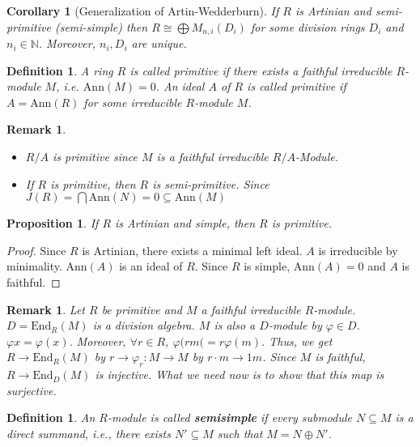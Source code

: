 \documentclass[letterpaper, leqno, 12pt]{article}
\newcommand{\fin}{\qquad \quad \hfill \framebox[1.75mm][l]{\,}}
\newcommand{\bN}{\mathbb{N}}
\newcommand{\Ann}{\mbox{Ann}}
\theoremstyle{stdthm}
\newtheorem{cor}[thm]{Corollary}
\newtheorem{prop}[thm]{Proposition}
\theoremstyle{stddef}
\newtheorem{defn}[thm]{Definition}
\newtheorem{rem}[thm]{Remark} %
\theoremstyle{stdnonum}
\theoremstyle{stdqands}
\theoremstyle{stdbold}
\begin{document}
\begin{cor} [Generalization of Artin-Wedderburn]
If $R$ is Artinian and semi-primitive (semi-simple) then $R \cong \bigoplus M_{n,i}(D_i)$ for some division rings $D_i$ and $n_i \in \bN$. Moreover, $n_i, D_i$ are unique. 
\end{cor}

\begin{defn}
A ring $R$ is called primitive if there exists a faithful irreducible $R$-module $M$, i.e. $\Ann(M) = 0$. An ideal $A$ of $R$ is called primitive if $A = \Ann(R)$ for some irreducible $R$-module $M$. 
\end{defn}

\begin{rem}
\begin{itemize}
\item $R/A$ is primitive since $M$ is a faithful irreducible $R/A$-Module. 
\item If $R$ is primitive, then $R$ is semi-primitive. Since $J(R) = \bigcap \Ann(N) = 0 \subseteq \Ann(M)$
\end{itemize}
\end{rem}

\begin{prop}
If $R$ is Artinian and simple, then $R$ is primitive. 
\end{prop}

\begin{proof}
Since $R$ is Artinian, there exists a minimal left ideal. $A$ is irreducible by minimality.  $\Ann(A)$ is an ideal of $R$. Since $R$ is simple, $\Ann(A) = 0$ and $A$ is faithful. 
\end{proof}

\begin{rem}
Let $R$ be primitive and $M$ a faithful irreducible $R$-module. $D = \mbox{End}_R(M)$ is a division algebra. $M$ is also a $D$-module by $\varphi \in D$. $\varphi x = \varphi(x)$. Moreover, $\forall r \in R$, $\varphi(rm( = r \varphi(m)$. Thus, we get $R \rightarrow \mbox{End}_R(M)$ by $r \rightarrow \varphi_r: M \rightarrow M$ by $r\cdot m \rightarrow 1m$. Since $M$ is faithful, $R \rightarrow \mbox{End}_D(M)$ is injective. What we need now is to show that this map is surjective.   
\end{rem}

\begin{defn}
An $R$-module is called {\bf semisimple} if every submodule $N\subseteq M$ is a direct summand, i.e., there exists $N' \subseteq M$ such that $M = N \oplus N'$. 
\end{defn}
\end{document}
